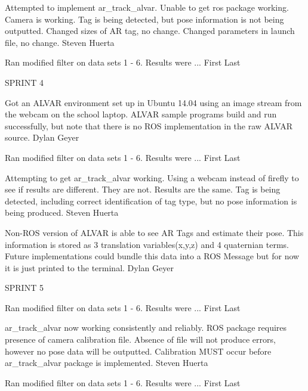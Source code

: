 \begin{description}
\item [12/28/15]  Attempted to implement ar\_track\_alvar. Unable to get ros package working. Camera is working. Tag is being detected, but pose information is not being outputted. Changed sizes of AR tag, no change. Changed parameters in launch file, no change. \hfill{Steven Huerta}

\item [1/4/16]  Ran modified filter on data sets 1 - 6.  Results were ... \hfill{First Last}

\item SPRINT 4

\item [1/18/16] Got an ALVAR environment set up in Ubuntu 14.04 using an image stream from the webcam on the school laptop. ALVAR sample programs build and run successfully, but note that there is no ROS implementation in the raw ALVAR source.  \hfill{Dylan Geyer}

\item [1/25/16]  Ran modified filter on data sets 1 - 6.  Results were ... \hfill{First Last}

\item [1/25/16]  Attempting to get ar\_track\_alvar working. Using a webcam instead of firefly to see if results are different. They are not. Results are the same. Tag is being detected, including correct identification of tag type, but no pose information is being produced.  \hfill{Steven Huerta}


\item [2/1/16]  Non-ROS version of ALVAR is able to see AR Tags and estimate their pose. This information is stored as 3 translation variables(x,y,z) and 4 quaternian terms. Future implementations could bundle this data into a ROS Message but for now it is just printed to the terminal. \hfill{Dylan Geyer}

\item SPRINT 5
\item [2/15/16]  Ran modified filter on data sets 1 - 6.  Results were ... \hfill{First Last}

\item [2/15/16]  ar\_track\_alvar now working consistently and reliably. ROS package requires presence of camera calibration file. Absence of file will not produce errors, however no pose data will be outputted. Calibration MUST occur before ar\_track\_alvar package is implemented. \hfill{Steven Huerta}

\item [2/22/16]  Ran modified filter on data sets 1 - 6.  Results were ... \hfill{First Last}


\end{description}
